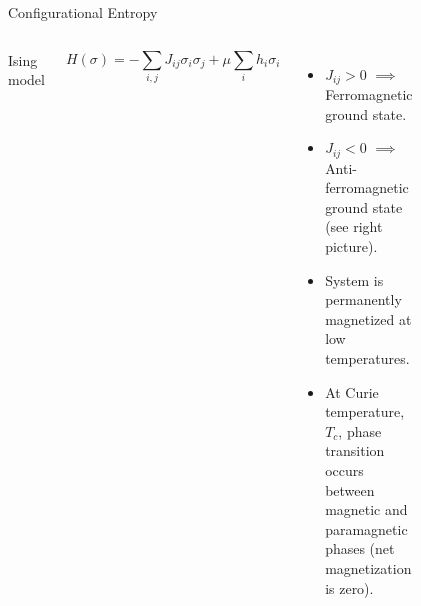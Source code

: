 \documentclass[aspectratio=169]{beamer}
\begin{document}
    \begin{frame}{Configurational Entropy}

        \begin{columns}
            Ising model

            \begin{equation*}
                H(\sigma) = -\sum_{i,j} J_{ij} \sigma_i \sigma_j + \mu \sum_i h_i \sigma_i
            \end{equation*}

            \begin{itemize}
                \item $J_{ij} > 0$ $\implies$ Ferromagnetic ground state.
                \item $J_{ij} < 0$ $\implies$ Anti-ferromagnetic ground state (see right picture).
                \item System is permanently magnetized at low temperatures.
                \item At Curie temperature, $T_c$, phase transition occurs between magnetic and paramagnetic phases (net magnetization is zero).
            \end{itemize}
            

            \begin{figure}
            \end{figure}

        \end{columns}
    \end{frame}
\end{document}
